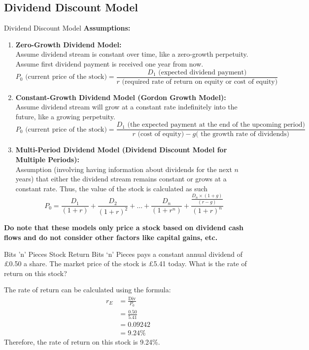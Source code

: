 \subsection*{Dividend Discount Model}
\begin{definitionbox}{Dividend Discount Model}
\textbf{Assumptions:}
\begin{enumerate}
    \item \textbf{Zero-Growth Dividend Model: }\\Assume dividend stream is constant over time, like a zero-growth perpetuity. Assume first dividend payment is received one year from now.
    \begin{equation}
        P_0 \text{ (current price of the stock)}= \frac{D_1 \text{ (expected dividend payment)}}{r \text{ (required rate of return on equity or cost of equity)}}
    \end{equation}
    \item \textbf{Constant-Growth Dividend Model (Gordon Growth Model): }\\Assume dividend stream will grow at a constant rate indefinitely into the future, like a growing perpetuity.
    \begin{equation}
        P_0 \text{ (current price of the stock)}= \frac{D_1 \text{ (the expected payment at the end of the upcoming period)}}{r \text{ (cost of equity)} - g \text{( the growth rate of dividends)}}
    \end{equation}
    \item \textbf{Multi-Period Dividend Model (Dividend Discount Model for Multiple Periods): }\\Assumption (involving having information about dividends for the next $n$ years) that either the dividend stream remains constant or grows at a constant rate. Thus, the value of the stock is calculated as such
    \begin{equation}
        P_0 = \frac{D_1}{(1+r)} + \frac{D_2}{(1+r)^2} + \ldots + \frac{D_n}{(1+r^n)} + \frac{\frac{D_n \times (1+g)}{(r-g)}}{(1+r)^n}
    \end{equation}
\end{enumerate}

\textbf{Do note that these models only price a stock based on dividend cash flows and do not consider other factors like capital gains, etc.}

\end{definitionbox}

\begin{examplebox}{Bits 'n' Pieces Stock Return}
    Bits ‘n’ Pieces pays a constant annual dividend of £0.50 a share. The market price of the stock is £5.41 today. What is the rate of return on this stock?
    
    The rate of return can be calculated using the formula:
    \begin{align*}
        r_E &= \frac{\text{Div}}{P_0} \\
        &= \frac{0.50}{5.41} \\
        &= 0.09242 \\
        &= 9.24\%
    \end{align*}
    Therefore, the rate of return on this stock is 9.24\%.
\end{examplebox}

